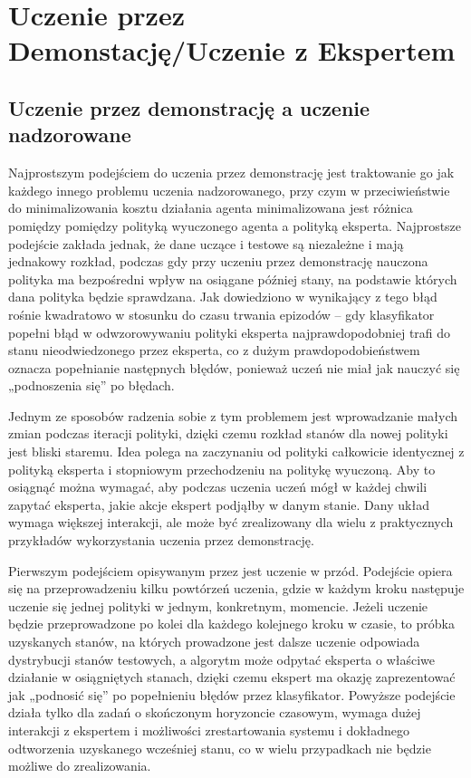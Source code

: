 \section{Uczenie przez Demonstację/Uczenie z Ekspertem}
\subsection{Uczenie przez demonstrację a uczenie nadzorowane}

Najprostszym podejściem do uczenia przez demonstrację jest traktowanie go jak każdego innego problemu uczenia nadzorowanego, przy czym w przeciwieństwie do minimalizowania kosztu działania agenta minimalizowana jest różnica pomiędzy pomiędzy polityką wyuczonego agenta a polityką eksperta. Najprostsze podejście zakłada jednak, że dane uczące i testowe są niezależne i mają jednakowy rozkład, podczas gdy przy uczeniu przez demonstrację nauczona polityka ma bezpośredni wpływ na osiągane później stany, na podstawie których dana polityka będzie sprawdzana. Jak dowiedziono w \cite{DBLP:journals/corr/abs-1011-0686} wynikający z tego błąd rośnie kwadratowo w stosunku do czasu trwania epizodów – gdy klasyfikator popełni błąd w odwzorowywaniu polityki eksperta najprawdopodobniej trafi do stanu nieodwiedzonego przez eksperta, co z dużym prawdopodobieństwem oznacza popełnianie następnych błędów, ponieważ uczeń nie miał jak nauczyć się „podnoszenia się” po błędach.

Jednym ze sposobów radzenia sobie z tym problemem jest wprowadzanie małych zmian podczas iteracji polityki, dzięki czemu rozkład stanów dla nowej polityki jest bliski staremu. Idea polega na zaczynaniu od polityki całkowicie identycznej z polityką eksperta i stopniowym przechodzeniu na politykę wyuczoną. Aby to osiągnąć można wymagać, aby podczas uczenia uczeń mógł w każdej chwili zapytać eksperta, jakie akcje ekspert podjąłby w danym stanie. Dany układ wymaga większej interakcji, ale może być zrealizowany dla wielu z praktycznych przykładów wykorzystania uczenia przez demonstrację.

Pierwszym podejściem opisywanym przez \cite{DBLP:journals/corr/abs-1011-0686} jest uczenie w przód. Podejście opiera się na przeprowadzeniu kilku powtórzeń uczenia, gdzie w każdym kroku następuje uczenie się jednej polityki w jednym, konkretnym, momencie. Jeżeli uczenie będzie przeprowadzone po kolei dla każdego kolejnego kroku w czasie, to próbka uzyskanych stanów, na których prowadzone jest dalsze uczenie odpowiada dystrybucji stanów testowych, a algorytm może odpytać eksperta o właściwe działanie w osiągniętych stanach, dzięki czemu ekspert ma okazję zaprezentować jak „podnosić się” po popełnieniu błędów przez klasyfikator. Powyższe podejście działa tylko dla zadań o skończonym horyzoncie czasowym, wymaga dużej interakcji z ekspertem i możliwości zrestartowania systemu i dokładnego odtworzenia uzyskanego wcześniej stanu, co w wielu przypadkach nie będzie możliwe do zrealizowania.

